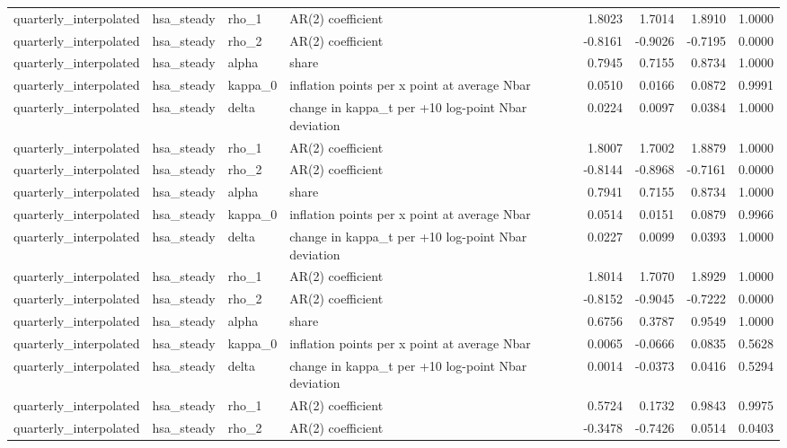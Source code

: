 \begin{tabular}{llllrrrr}
quarterly\_interpolated & hsa\_steady & rho\_1 & AR(2) coefficient & 1.8023 & 1.7014 & 1.8910 & 1.0000 \\
quarterly\_interpolated & hsa\_steady & rho\_2 & AR(2) coefficient & -0.8161 & -0.9026 & -0.7195 & 0.0000 \\
quarterly\_interpolated & hsa\_steady & alpha & share & 0.7945 & 0.7155 & 0.8734 & 1.0000 \\
quarterly\_interpolated & hsa\_steady & kappa\_0 & inflation points per x point at average Nbar & 0.0510 & 0.0166 & 0.0872 & 0.9991 \\
quarterly\_interpolated & hsa\_steady & delta & change in kappa\_t per +10 log-point Nbar deviation & 0.0224 & 0.0097 & 0.0384 & 1.0000 \\
quarterly\_interpolated & hsa\_steady & rho\_1 & AR(2) coefficient & 1.8007 & 1.7002 & 1.8879 & 1.0000 \\
quarterly\_interpolated & hsa\_steady & rho\_2 & AR(2) coefficient & -0.8144 & -0.8968 & -0.7161 & 0.0000 \\
quarterly\_interpolated & hsa\_steady & alpha & share & 0.7941 & 0.7155 & 0.8734 & 1.0000 \\
quarterly\_interpolated & hsa\_steady & kappa\_0 & inflation points per x point at average Nbar & 0.0514 & 0.0151 & 0.0879 & 0.9966 \\
quarterly\_interpolated & hsa\_steady & delta & change in kappa\_t per +10 log-point Nbar deviation & 0.0227 & 0.0099 & 0.0393 & 1.0000 \\
quarterly\_interpolated & hsa\_steady & rho\_1 & AR(2) coefficient & 1.8014 & 1.7070 & 1.8929 & 1.0000 \\
quarterly\_interpolated & hsa\_steady & rho\_2 & AR(2) coefficient & -0.8152 & -0.9045 & -0.7222 & 0.0000 \\
quarterly\_interpolated & hsa\_steady & alpha & share & 0.6756 & 0.3787 & 0.9549 & 1.0000 \\
quarterly\_interpolated & hsa\_steady & kappa\_0 & inflation points per x point at average Nbar & 0.0065 & -0.0666 & 0.0835 & 0.5628 \\
quarterly\_interpolated & hsa\_steady & delta & change in kappa\_t per +10 log-point Nbar deviation & 0.0014 & -0.0373 & 0.0416 & 0.5294 \\
quarterly\_interpolated & hsa\_steady & rho\_1 & AR(2) coefficient & 0.5724 & 0.1732 & 0.9843 & 0.9975 \\
quarterly\_interpolated & hsa\_steady & rho\_2 & AR(2) coefficient & -0.3478 & -0.7426 & 0.0514 & 0.0403 \\

\end{tabular}
